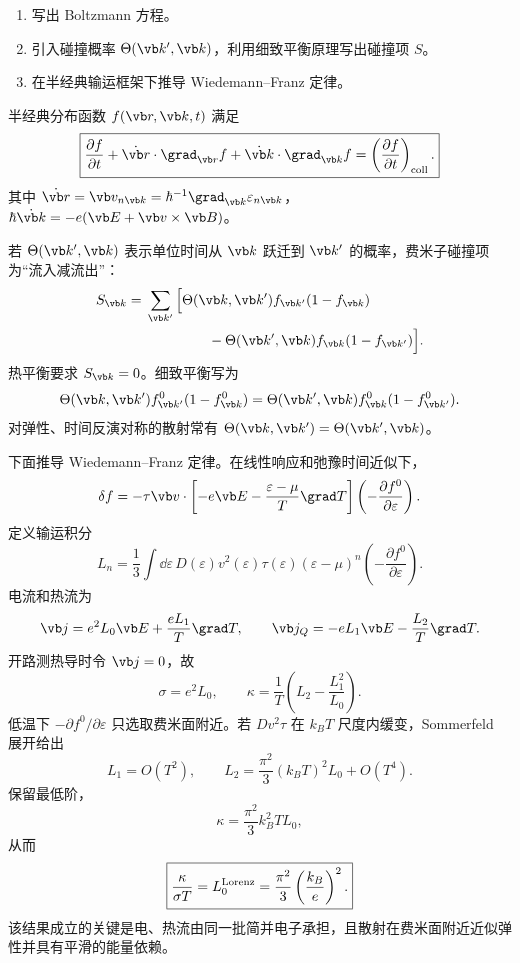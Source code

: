 \begin{question}
\begin{enumerate}
  \item 写出 Boltzmann 方程。
  \item 引入碰撞概率 $\Theta(\vb k',\vb k)$，利用细致平衡原理写出碰撞项 $S$。
  \item 在半经典输运框架下推导 Wiedemann--Franz 定律。
\end{enumerate}


\begin{solution}
半经典分布函数 $f(\vb r,\vb k,t)$ 满足
\[
 \boxed{\frac{\partial f}{\partial t}
 +\dot{\vb r}\cdot\grad_{\vb r}f
 +\dot{\vb k}\cdot\grad_{\vb k}f
 =\left(\frac{\partial f}{\partial t}\right)_{\rm coll}.}
\]
其中
$\dot{\vb r}=\vb v_{n\vb k}=\hbar^{-1}\grad_{\vb k}\varepsilon_{n\vb k}$，
$\hbar\dot{\vb k}=-e(\vb E+\vb v\times\vb B)$。

若 $\Theta(\vb k',\vb k)$ 表示单位时间从 $\vb k$ 跃迁到 $\vb k'$ 的概率，费米子碰撞项为“流入减流出”：
\[
\begin{aligned}
 S_{\vb k}={}&\sum_{\vb k'}\Big[
 \Theta(\vb k,\vb k')f_{\vb k'}(1-f_{\vb k})\\
 &\hspace{4.5em}-\Theta(\vb k',\vb k)f_{\vb k}(1-f_{\vb k'})\Big].
\end{aligned}
\]
热平衡要求 $S_{\vb k}=0$。细致平衡写为
\[
 \Theta(\vb k,\vb k')f^0_{\vb k'}(1-f^0_{\vb k})
 =\Theta(\vb k',\vb k)f^0_{\vb k}(1-f^0_{\vb k'}).
\]
对弹性、时间反演对称的散射常有
$\Theta(\vb k,\vb k')=\Theta(\vb k',\vb k)$。

下面推导 Wiedemann--Franz 定律。在线性响应和弛豫时间近似下，
\[
 \delta f=-\tau\vb v\cdot
 \left[-e\vb E-\frac{\varepsilon-\mu}{T}\grad T\right]
 \left(-\frac{\partial f^0}{\partial\varepsilon}\right).
\]
定义输运积分
\[
 L_n=\frac13\int\dd\varepsilon\,D(\varepsilon)v^2(\varepsilon)
 \tau(\varepsilon)(\varepsilon-\mu)^n
 \left(-\frac{\partial f^0}{\partial\varepsilon}\right).
\]
电流和热流为
\[
 \vb j=e^2L_0\vb E+\frac{eL_1}{T}\grad T,
 \qquad
 \vb j_Q=-eL_1\vb E-\frac{L_2}{T}\grad T.
\]
开路测热导时令 $\vb j=0$，故
\[
 \sigma=e^2L_0,
 \qquad
 \kappa=\frac1T\left(L_2-\frac{L_1^2}{L_0}\right).
\]
低温下 $-\partial f^0/\partial\varepsilon$ 只选取费米面附近。若
$D v^2\tau$ 在 $k_BT$ 尺度内缓变，Sommerfeld 展开给出
\[
 L_1=O(T^2),\qquad
 L_2=\frac{\pi^2}{3}(k_BT)^2L_0+O(T^4).
\]
保留最低阶，
\[
 \kappa=\frac{\pi^2}{3}k_B^2TL_0,
 \]
从而
\[
 \boxed{\frac{\kappa}{\sigma T}=L_0^{\rm Lorenz}
 =\frac{\pi^2}{3}\left(\frac{k_B}{e}\right)^2.}
\]
该结果成立的关键是电、热流由同一批简并电子承担，且散射在费米面附近近似弹性并具有平滑的能量依赖。
\end{solution}
\end{question}

